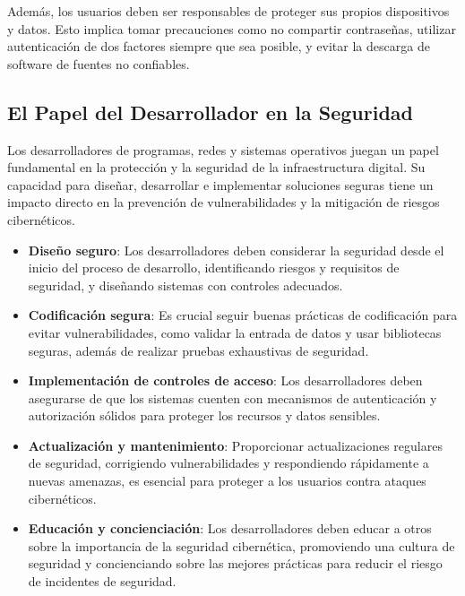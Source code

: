 \documentclass[12pt, a4paper]{article} %
\begin{document}
Además, los usuarios deben ser responsables de proteger sus propios dispositivos y datos. Esto implica tomar precauciones como no compartir contraseñas, utilizar autenticación de dos factores siempre que sea posible, y evitar la descarga de software de fuentes no confiables.

\subsection{El Papel del Desarrollador en la Seguridad}

Los desarrolladores de programas, redes y sistemas operativos juegan un papel fundamental en la protección y la seguridad de la infraestructura digital. Su capacidad para diseñar, desarrollar e implementar soluciones seguras tiene un impacto directo en la prevención de vulnerabilidades y la mitigación de riesgos cibernéticos.

\begin{itemize}
	\item \textbf{Diseño seguro}: Los desarrolladores deben considerar la seguridad desde el inicio del proceso de desarrollo, identificando riesgos y requisitos de seguridad, y diseñando sistemas con controles adecuados.

	\item \textbf{Codificación segura}: Es crucial seguir buenas prácticas de codificación para evitar vulnerabilidades, como validar la entrada de datos y usar bibliotecas seguras, además de realizar pruebas exhaustivas de seguridad.

	\item \textbf{Implementación de controles de acceso}: Los desarrolladores deben asegurarse de que los sistemas cuenten con mecanismos de autenticación y autorización sólidos para proteger los recursos y datos sensibles.

	\item \textbf{Actualización y mantenimiento}: Proporcionar actualizaciones regulares de seguridad, corrigiendo vulnerabilidades y respondiendo rápidamente a nuevas amenazas, es esencial para proteger a los usuarios contra ataques cibernéticos.

	\item \textbf{Educación y concienciación}: Los desarrolladores deben educar a otros sobre la importancia de la seguridad cibernética, promoviendo una cultura de seguridad y concienciando sobre las mejores prácticas para reducir el riesgo de incidentes de seguridad.
\end{itemize}
\end{document}
